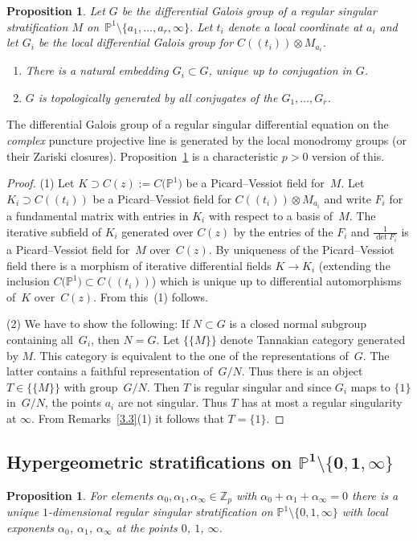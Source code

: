 \documentclass[pdftex]{sigma}
\numberwithin{equation}{section}
\newtheorem{Proposition}[Theorem]{Proposition}
\begin{document}
\begin{Proposition}\label{3.4} Let $G$ be the differential Galois group of a regular singular stratification $M$ on~$\mathbb{P}^1\setminus \{a_1,\dots ,a_r,\infty \}$. Let $t_i$ denote a local coordinate at $a_i$ and let $G_i$ be the local differential Galois group for $ C((t_i))\otimes M_{a_i}$.
 \begin{enumerate}\itemsep=0pt
\item[$(1)$] There is a natural embedding $G_i\subset G$, unique up to conjugation in $G$.
\item[$(2)$] $G$ is topologically generated by all conjugates of the $G_1,\dots ,G_r$.
\end{enumerate}
\end{Proposition}

The differential Galois group of a regular singular differential equation on the {\it complex} puncture projective line is generated by the local monodromy groups (or their Zariski closures). Proposition~\ref{3.4} is a characteristic $p>0$ version of this.
\begin{proof} (1) Let $K\supset C(z):=C\big(\mathbb{P}^1\big)$ be a Picard--Vessiot field for~$M$. Let $K_i\supset C((t_i))$ be a Picard--Vessiot field for $ C((t_i))\otimes M_{a_i}$ and write $F_i$ for a fundamental matrix with entries in $K_i$ with respect to a basis of~$M$. The iterative subfield of $K_i$ generated over $C(z)$ by the entries of the $F_i$ and $\frac{1}{\det F_i}$ is a Picard--Vessiot field for~$M$ over~$C(z)$. By uniqueness of the Picard--Vessiot field there is a morphism of iterative differential fields $K\rightarrow K_i$ (extending the inclusion $C\big(\mathbb{P}^1\big)\subset C((t_i))$) which is unique up to differential automorphisms of~$K$ over~$C(z)$. From this~(1) follows.

(2) We have to show the following: If $N\subset G$ is a closed normal subgroup containing all~$G_i$, then $N=G$. Let $\{\{M\}\}$ denote Tannakian category generated by $M$. This category is equivalent to the one of the representations of~$G$. The latter contains a faithful representation of~$G/N$. Thus there is an object $T\in \{\{M\}\}$ with group~$G/N$. Then $T$ is regular singular and since $G_i$ maps to $\{1\}$ in~$G/N$, the points $a_i$ are not singular. Thus $T$ has at most a regular singularity at $\infty$. From Remarks~\ref{3.3}(1) it follows that $T=\{1\}$. \end{proof}

\subsection[Hypergeometric stratifications on $\mathbb{P}^1\setminus \{0,1,\infty \}$]{Hypergeometric stratifications on $\boldsymbol{\mathbb{P}^1\setminus \{0,1,\infty \}}$}\label{section3.2}
\begin{Proposition}\label{3.5} For elements $\alpha _0,\alpha _1,\alpha _\infty \in \mathbb{Z}_p$ with $\alpha_0+\alpha_1+\alpha_\infty =0$ there is a unique $1$-dimensional regular singular stratification on $\mathbb{P}^1\setminus \{0,1,\infty \}$ with local exponents $\alpha_0$, $\alpha_1$, $\alpha_\infty$ at the points $0$, $1$, $\infty$.
 \end{Proposition}
\end{document}
